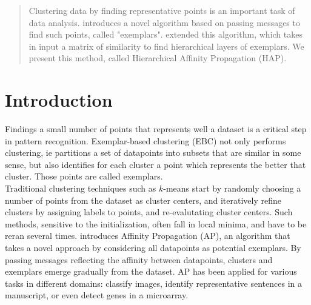 \documentclass{ipol}
\begin{document}
\begin{abstract}

Clustering data by finding representative points is an important task of data
analysis. \cite{frey07affinitypropagation} introduces a novel
algorithm based on passing messages to find such points, called "exemplars".
\cite{hap} extended this algorithm, which takes in input a matrix of
similarity to find hierarchical layers of exemplars.
We present this method, called Hierarchical Affinity Propagation (HAP).

\end{abstract}

\begin{ipolCode}
\end{ipolCode}

\begin{ipolSupp}
\end{ipolSupp}

\section{Introduction}

Findings a small number of points that represents well a dataset is a critical
step in pattern recognition. Exemplar-based clustering (EBC) not only performs
clustering, ie partitions a set of datapoints into subsets that are similar in
some sense, but also identifies for each cluster a point which represents the
better that cluster. Those points are called exemplars.\\

Traditional clustering techniques such as $k$-means start by randomly choosing
a number of points from the dataset as cluster centers, and iteratively refine
clusters by assigning labels to points, and re-evalutating cluster centers.
Such methods, sensitive to the initialization, often fall in local minima, and
have to be reran several times. \cite{frey07affinitypropagation} introduces
Affinity Propagation (AP), an algorithm that takes a novel approach by
considering all datapoints as potential exemplars. By passing messages
reflecting the affinity between datapoints, clusters and exemplars emerge
gradually from the dataset. AP has been applied for various tasks in different
domains: classify images, identify representative sentences in a manuscript,
or even detect genes in a microarray.\\
\end{document}
